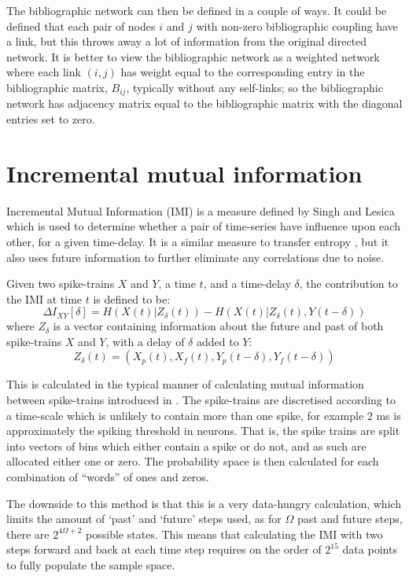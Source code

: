The bibliographic network can then be defined in a couple of ways.  It could be defined that each pair of nodes $i$ and $j$ with non-zero bibliographic coupling have a link, but this throws away a lot of information from the original directed network.  It is better to view the bibliographic network as a weighted network where each link $(i,j)$ has weight equal to the corresponding entry in the bibliographic matrix, $B_{ij}$, typically without any self-links; so the bibliographic network has adjacency matrix equal to the bibliographic matrix with the diagonal entries set to zero.

\section{Incremental mutual information}
Incremental Mutual Information (IMI) is a measure defined by Singh and Lesica \citep{SinghLesica2010a} which is used to determine whether a pair of time-series have influence upon each other, for a given time-delay.  It is a similar measure to transfer entropy \citep{Schreiber2000a}, but it also uses future information to further eliminate any correlations due to noise.

Given two spike-trains $X$ and $Y$, a time $t$, and a time-delay $\delta$, the contribution to the IMI at time $t$ is defined to be:
\begin{equation}
\Delta I_{XY}[\delta] = H\left(X(t) | Z_{\delta}(t)\right) - H\left(X(t) | Z_{\delta}(t),Y(t-\delta)\right)
\end{equation}
where $Z_{\delta}$ is a vector containing information about the future and past of both spike-trains $X$ and $Y$, with a delay of $\delta$ added to $Y$:
\begin{equation}
Z_{\delta}(t) =  \left(X_p(t),X_f(t),Y_p(t-\delta), Y_f(t-\delta)\right)
\end{equation}

This is calculated in the typical manner of calculating mutual information between spike-trains introduced in \citep{BialekEtAl1998a}.  The spike-trains are discretised according to a time-scale which is unlikely to contain more than one spike, for example $2$ ms is approximately the spiking threshold in neurons. That is, the spike trains are split into vectors of bins which either contain a spike or do not, and as such are allocated either one or zero.  The probability space is then calculated for each combination of ``words'' of ones and zeros.

The downside to this method is that this is a very data-hungry calculation, which limits the amount of `past' and `future' steps used, as for $\Omega$ past and future steps, there are $2^{4\Omega+2}$ possible states. This means that calculating the IMI with two steps forward and back at each time step requires on the order of $2^{15}$ data points to fully populate the sample space.

